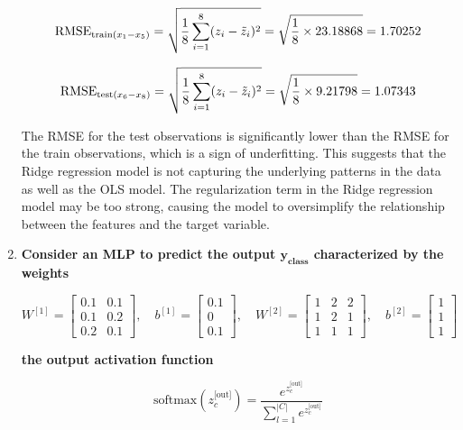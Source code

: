 \documentclass[12pt]{article}
\begin{document}
\begin{enumerate}
    \begin{equation*}
        \text{RMSE}_{\text{train}(x_1\--x_5)} = \sqrt{\frac{1}{8} \sum_{i=1}^{8} (z_{i} - \tilde{z}_{i})^2} = \sqrt{\frac{1}{8} \times 23.18868} = 1.70252
    \end{equation*}
 
    \begin{equation*}
        \text{RMSE}_{\text{test}(x_6\--x_8)} = \sqrt{\frac{1}{8} \sum_{i=1}^{8} (z_{i} - \tilde{z}_{i})^2} = \sqrt{\frac{1}{8} \times 9.21798} = 1.07343
    \end{equation*}

    \vspace{10pt}
    The RMSE for the test observations is significantly lower than the RMSE for the train observations, which is a sign of underfitting. This suggests that the Ridge regression model is not capturing the underlying patterns in the data as well as the OLS model. The regularization term in the Ridge regression model may be too strong, causing the model to oversimplify the relationship between the features and the target variable.

    \vspace{10pt}
    \item \textbf{Consider an MLP to predict the output $\mathbf{y_\text{class}}$ characterized by the weights}
    
    \[
W^{[1]} = \begin{bmatrix}
0.1 & 0.1 \\
0.1 & 0.2 \\
0.2 & 0.1
\end{bmatrix}, \quad
b^{[1]} = \begin{bmatrix}
0.1 \\
0 \\
0.1
\end{bmatrix}, \quad
W^{[2]} = \begin{bmatrix}
1 & 2 & 2 \\
1 & 2 & 1 \\
1 & 1 & 1
\end{bmatrix}, \quad
b^{[2]} = \begin{bmatrix}
1 \\
1 \\
1
\end{bmatrix}
\]

\textbf{the output activation function}

\begin{equation*}
    \text{softmax}(z_c^\text{[out]}) = \frac{e^{z_c^\text{[out]}}}{\sum_{l=1}^{|C|} e^{z_c^\text{[out]}}}
\end{equation*}


\end{enumerate}
\end{document}
